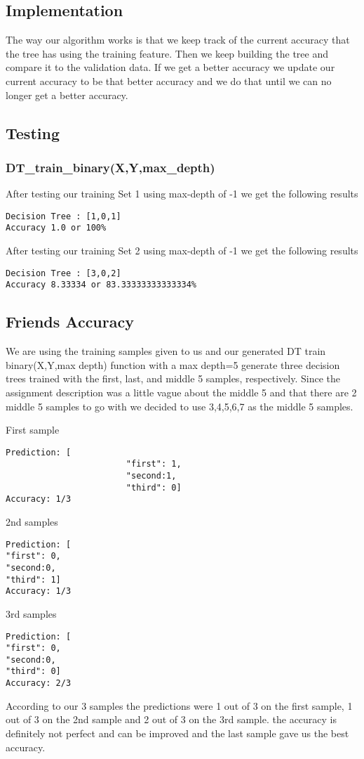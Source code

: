 \documentclass{article}
\begin{document}
\subsection{Implementation}
The way our algorithm works is that we keep track of the current accuracy that the tree has using the training feature. Then we keep building the tree and compare it to the validation data. If we get a better accuracy we update our current accuracy to be that better accuracy and we do that until we can no longer get a better accuracy.
\subsection{Testing}
\subsubsection{DT\_train\_binary(X,Y,max\_depth)}
After testing our training Set 1 using max-depth of -1 we get the following results
\begin{lstlisting}
Decision Tree : [1,0,1]
Accuracy 1.0 or 100%
\end{lstlisting}
After testing our training Set 2 using max-depth of -1 we get the following results
\begin{lstlisting}
Decision Tree : [3,0,2]
Accuracy 8.33334 or 83.33333333333334%
\end{lstlisting}

\subsection{Friends Accuracy}
We are using the training samples given to us and our generated DT train binary(X,Y,max depth) function with a max depth=5
generate three decision trees trained with the first, last, and middle 5 samples, respectively. Since the assignment description was a little vague about the middle 5 and that there are 2 middle 5 samples to go with we decided to use 3,4,5,6,7 as the middle 5 samples.

First sample
\begin{lstlisting}
Prediction: [
						"first": 1,
						"second:1,
						"third": 0]
Accuracy: 1/3
\end{lstlisting}
2nd samples 
\begin{lstlisting}
Prediction: [
"first": 0,
"second:0,
"third": 1]
Accuracy: 1/3
\end{lstlisting}
3rd samples 
\begin{lstlisting}
Prediction: [
"first": 0,
"second:0,
"third": 0]
Accuracy: 2/3
\end{lstlisting}
According to our 3 samples the predictions were 1 out of 3 on the first sample, 1 out of 3 on the 2nd sample and 2 out of 3 on the 3rd sample. the accuracy is definitely not perfect and can be improved and the last sample gave us the best accuracy.
\end{document}
